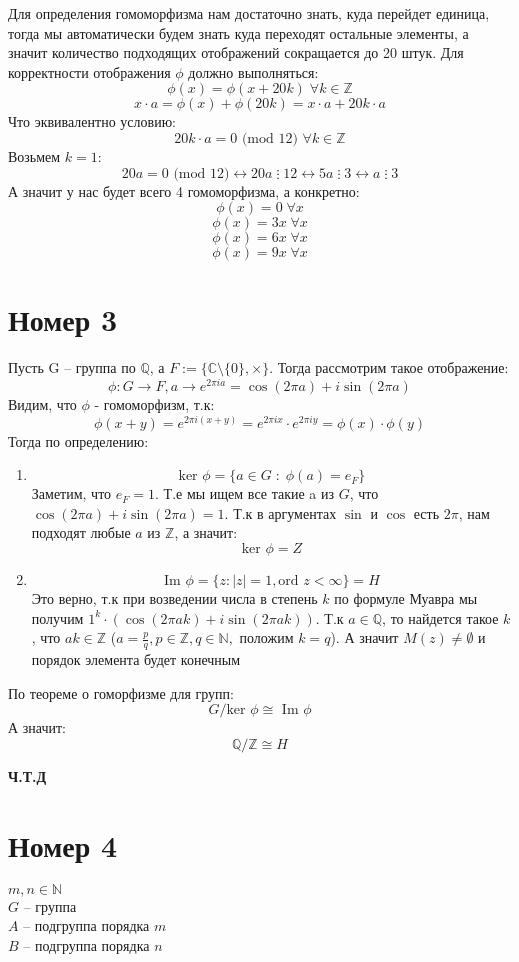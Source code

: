 \documentclass[a4paper,12pt]{article}
\begin{document}
Для определения гомоморфизма нам достаточно знать, куда перейдет единица, тогда мы автоматически будем знать куда переходят остальные элементы, а значит количество подходящих отображений сокращается до 20 штук. Для корректности отображения $\phi$ должно выполняться:
\[
\phi(x) = \phi(x + 20k) \; \forall k \in \mathbb{Z}
\]
\[
x \cdot a = \phi(x) + \phi(20k) = x\cdot a + 20k \cdot a
\]
Что эквивалентно условию:
\[
20k \cdot a = 0 \text{ (mod 12) } \forall k \in \mathbb{Z}
\]
Возьмем $k = 1$:
\[
20a = 0 \text{ (mod 12)} \leftrightarrow 20a \; \vdots \; 12 \leftrightarrow 5a \; \vdots \; 3 \leftrightarrow a \; \vdots \; 3
\]
А значит у нас будет всего 4 гомоморфизма, а конкретно:
\[
\phi(x) = 0 \; \forall x
\]
\[
\phi(x) = 3x  \; \forall x
\]
\[
\phi(x) = 6x  \; \forall x
\]
\[
\phi(x) = 9x  \; \forall x
\]
\clearpage
\section*{Номер 3}
Пусть G -- группа по $\mathbb{Q}$, а $F := \{\mathbb{C} \setminus \{0\}, \times\}$. Тогда рассмотрим такое отображение:
\[
\phi: G \rightarrow F, a \rightarrow e^{2\pi i a} = \cos(2 \pi a) + i \sin(2\pi a)
\]
Видим, что  $\phi$ - гомоморфизм, т.к:
\[
\phi(x + y) = e^{2\pi i(x + y)} = e^{2\pi i x} \cdot e^{2\pi i y} = \phi(x) \cdot \phi(y)
\]Тогда по определению:
\begin{enumerate}
\item
\[
\text{ker } \phi = \{a \in G\; : \;\phi(a) = e_{F} \}  
\]
Заметим,  что $e_{F} = 1$. Т.е мы ищем все такие a из $G$, что $ \cos(2 \pi a) + i \sin(2\pi a) = 1$. Т.к в аргументах $\sin$ и $\cos$ есть $2 \pi$, нам подходят любые $a$ из $\mathbb{Z}$, а значит:
\[
\text{ker } \phi  = Z
\]
\item
\[
\text{Im } \phi  = \{z : |z| = 1, \text{ord } z < \infty  \} = H
\]
Это верно, т.к при возведении числа в степень $k$ по формуле Муавра мы получим $1^k \cdot (\cos(2 \pi a k) + i \sin(2\pi a k))$. Т.к $a \in \mathbb{Q}$, то найдется такое $k$, что $ak \in \mathbb{Z}$ ($a = \frac{p}{q}, p \in \mathbb{Z}, q \in \mathbb{N},$ положим $ k = q$). А значит $M(z) \neq \emptyset$ и порядок элемента будет конечным
\end{enumerate}
По теореме о гоморфизме для групп:
\[
G / \text{ker } \phi \cong \text{ Im } \phi
\]
А значит:
\[
\mathbb{Q} / \mathbb{Z} \cong H
\]
\begin{center}
\textbf{Ч.Т.Д} 
\end{center}
\clearpage
\section*{Номер 4}
$m, n \in \mathbb{N}$
\\
$G$ -- группа
\\
$A$ -- подгруппа порядка $m$
\\
$B$ -- подгруппа порядка $n$
\end{document}

